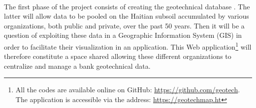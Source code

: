 \paragraph{}
The first phase of the project consists of creating the geotechnical database
. The latter will allow data to be pooled
 on the Haitian subsoil accumulated by various organizations, both public and private,
 over the past 50 years. Then it will be a question of exploiting these
 data in a Geographic Information System (GIS) in order to facilitate their visualization in an application.
  This Web application\footnote{ 
    All the codes are available online on GitHub: 
    \url{https://github.com/geotech}.
    The application is accessible via the address: 
    \url{https://geotechmap.ht}
    }
  will therefore constitute a space
 shared allowing these different organizations to centralize and manage a bank
 geotechnical data.

